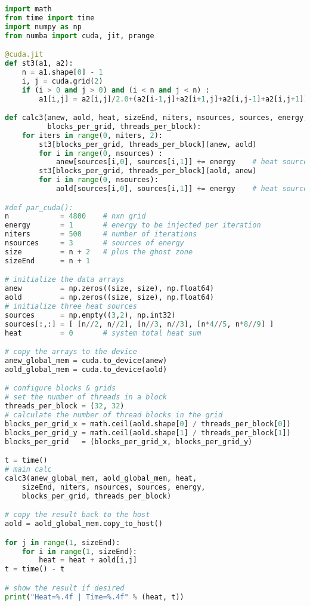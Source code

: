 \begin{lstlisting}[language=Python, caption={Numba-GPU implementation of the stencil test case.}]
import math
from time import time
import numpy as np
from numba import cuda, jit, prange

@cuda.jit
def st3(a1, a2):
    n = a1.shape[0] - 1
    i, j = cuda.grid(2)
    if (i > 0 and j > 0) and (i < n and j < n) :
        a1[i,j] = a2[i,j]/2.0+(a2[i-1,j]+a2[i+1,j]+a2[i,j-1]+a2[i,j+1])/8.0

def calc3(anew, aold, heat, sizeEnd, niters, nsources, sources, energy,
          blocks_per_grid, threads_per_block):
    for iters in range(0, niters, 2):
        st3[blocks_per_grid, threads_per_block](anew, aold)
        for i in range(0, nsources) :
            anew[sources[i,0], sources[i,1]] += energy    # heat source
        st3[blocks_per_grid, threads_per_block](aold, anew)
        for i in range(0, nsources):  
            aold[sources[i,0], sources[i,1]] += energy    # heat source        

#def par_cuda():
n            = 4800    # nxn grid
energy       = 1       # energy to be injected per iteration
niters       = 500     # number of iterations
nsources     = 3       # sources of energy
size         = n + 2   # plus the ghost zone
sizeEnd      = n + 1

# initialize the data arrays
anew         = np.zeros((size, size), np.float64)
aold         = np.zeros((size, size), np.float64)
# initialize three heat sources
sources      = np.empty((3,2), np.int32)
sources[:,:] = [ [n//2, n//2], [n//3, n//3], [n*4//5, n*8//9] ]
heat         = 0       # system total heat sum

# copy the arrays to the device
anew_global_mem = cuda.to_device(anew)
aold_global_mem = cuda.to_device(aold)

# configure blocks & grids
# set the number of threads in a block
threads_per_block = (32, 32)
# calculate the number of thread blocks in the grid
blocks_per_grid_x = math.ceil(aold.shape[0] / threads_per_block[0])
blocks_per_grid_y = math.ceil(aold.shape[1] / threads_per_block[1])
blocks_per_grid   = (blocks_per_grid_x, blocks_per_grid_y)

t = time()
# main calc
calc3(anew_global_mem, aold_global_mem, heat,
    sizeEnd, niters, nsources, sources, energy,
    blocks_per_grid, threads_per_block)

# copy the result back to the host
aold = aold_global_mem.copy_to_host()

for j in range(1, sizeEnd):
    for i in range(1, sizeEnd):
        heat = heat + aold[i,j]
t = time() - t

# show the result if desired
print("Heat=%.4f | Time=%.4f" % (heat, t))
\end{lstlisting}






